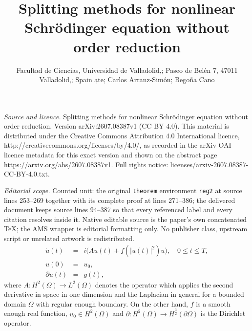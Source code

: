 \documentclass[10pt,a4paper]{amsart}
\begin{document}
\title[Splitting methods for nonlinear Schr"odinger equation withou]{Splitting methods for nonlinear Schr\"odinger equation without order reduction}
\author{Facultad de Ciencias, Universidad de Valladolid,; Paseo de Belén 7, 47011 Valladolid,; Spain ạte; Carlos Arranz-Simón; Begoña Cano}
\date{}
\maketitle
\noindent\emph{Source and licence.} Splitting methods for nonlinear Schr\"odinger equation without order reduction. Version arXiv:2607.08387v1 (CC BY 4.0). This material is distributed under the Creative Commons Attribution 4.0 International licence, http://creativecommons.org/licenses/by/4.0/, as recorded in the arXiv OAI licence metadata for this exact version and shown on the abstract page https://arxiv.org/abs/2607.08387v1. Full rights notice: licenses/arxiv-2607.08387-CC-BY-4.0.txt.\par\smallskip
\noindent\textit{Editorial scope.} Counted unit: the original \texttt{theorem} environment \texttt{reg2} at source lines 253--269 together with its complete proof at lines 271--386; the delivered document keeps source lines 94--387 so that every referenced label and every citation resolves inside it. Native editable source is the paper's own concatenated TeX; the AMS wrapper is editorial formatting only. No publisher class, upstream script or unrelated artwork is redistributed.
\begin{eqnarray}
\dot{u}(t)&=& i \big(A u(t)+f(|u(t)|^2) u\big), \quad 0 \le t \le T,\nonumber \\
u(0)&=&u_0,  \nonumber \\
\partial u(t)&=& g(t), \label{nlse}
\end{eqnarray}
where $A: H^2(\Omega)\to L^2(\Omega)$ denotes the operator which applies the second derivative in space in one dimension and the Laplacian in general for a bounded domain $\Omega$ with regular enough boundary. On the other hand, $f$ is a smooth enough real function, $u_0\in H^2(\Omega)$ and $\partial: H^2(\Omega) \to H^ {\frac{3}{2}}(\partial \Omega)$ is the Dirichlet operator.
\end{document}
